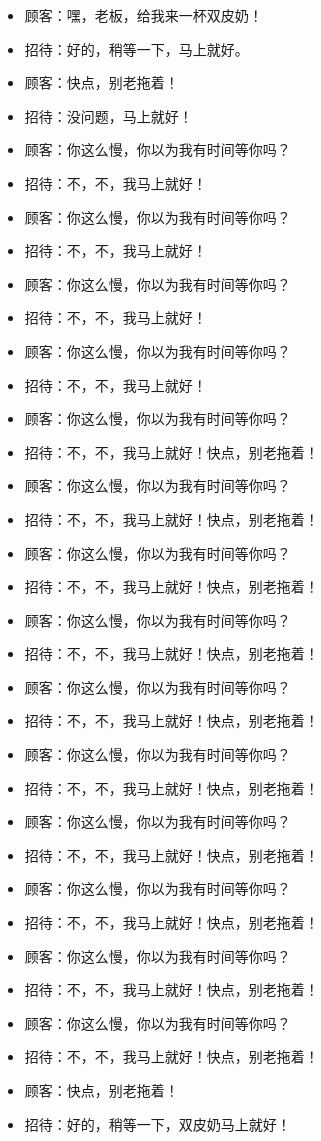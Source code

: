 \documentclass[titlepage,oneside]{ctexbook}
\begin{document}
\begin{itemize}
    \item 顾客：嘿，老板，给我来一杯双皮奶！
    \item 招待：好的，稍等一下，马上就好。
    \item 顾客：快点，别老拖着！
    \item 招待：没问题，马上就好！
    \item 顾客：你这么慢，你以为我有时间等你吗？
    \item 招待：不，不，我马上就好！
    \item 顾客：你这么慢，你以为我有时间等你吗？
    \item 招待：不，不，我马上就好！
    \item 顾客：你这么慢，你以为我有时间等你吗？
    \item 招待：不，不，我马上就好！
    \item 顾客：你这么慢，你以为我有时间等你吗？
    \item 招待：不，不，我马上就好！
    \item 顾客：你这么慢，你以为我有时间等你吗？
    \item 招待：不，不，我马上就好！快点，别老拖着！
    \item 顾客：你这么慢，你以为我有时间等你吗？
    \item 招待：不，不，我马上就好！快点，别老拖着！
    \item 顾客：你这么慢，你以为我有时间等你吗？
    \item 招待：不，不，我马上就好！快点，别老拖着！
    \item 顾客：你这么慢，你以为我有时间等你吗？
    \item 招待：不，不，我马上就好！快点，别老拖着！
    \item 顾客：你这么慢，你以为我有时间等你吗？
    \item 招待：不，不，我马上就好！快点，别老拖着！
    \item 顾客：你这么慢，你以为我有时间等你吗？
    \item 招待：不，不，我马上就好！快点，别老拖着！
    \item 顾客：你这么慢，你以为我有时间等你吗？
    \item 招待：不，不，我马上就好！快点，别老拖着！
    \item 顾客：你这么慢，你以为我有时间等你吗？
    \item 招待：不，不，我马上就好！快点，别老拖着！
    \item 顾客：你这么慢，你以为我有时间等你吗？
    \item 招待：不，不，我马上就好！快点，别老拖着！
    \item 顾客：你这么慢，你以为我有时间等你吗？
    \item 招待：不，不，我马上就好！快点，别老拖着！
    \item 顾客：快点，别老拖着！
    \item 招待：好的，稍等一下，双皮奶马上就好！
\end{itemize}
\end{document}
